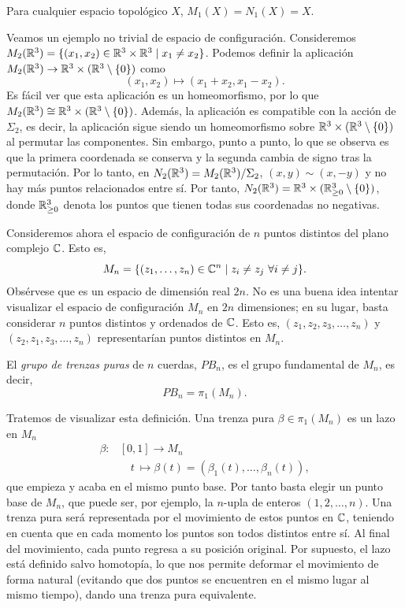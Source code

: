 \documentclass[TFG.tex]{subfiles}
\begin{document}
\begin{observacion}
Para cualquier espacio topológico $X$, $M_1(X)=N_1(X)=X$.
\end{observacion}

\begin{ej}
Veamos un ejemplo no trivial de espacio de configuración. Consideremos $M_2(\mathbb{R}^3)=\{(x_1,x_2)\in\mathbb{R}^3\times\mathbb{R}^3\mid x_1\neq x_2\}$. Podemos definir la aplicación $M_2(\mathbb{R}^3)\to \mathbb{R}^3\times(\mathbb{R}^3\setminus\{0\})$ como
\[
(x_1,x_2)\mapsto (x_1+x_2,x_1-x_2).
\]
Es fácil ver que esta aplicación es un homeomorfismo, por lo que $M_2(\mathbb{R}^3)\cong \mathbb{R}^3\times(\mathbb{R}^3\setminus\{0\})$. Además, la aplicación es compatible con la acción de $\Sigma_2$, es decir, la aplicación sigue siendo un homeomorfismo sobre $\mathbb{R}^3\times(\mathbb{R}^3\setminus\{0\})$ al permutar las componentes. Sin embargo, punto a punto, lo que se observa es que la primera coordenada se conserva y la segunda cambia de signo tras la permutación. Por lo tanto, en $N_2(\mathbb{R}^3)=M_2(\mathbb{R}^3)/\Sigma_2$, $(x,y)\sim (x,-y)$ y no hay más puntos relacionados entre sí. Por tanto, $N_2(\mathbb{R}^3)=\mathbb{R}^3\times(\mathbb{R}^3_{\geq 0}\setminus\{0\})$, donde $\mathbb{R}^3_{\geq 0}$ denota los puntos que tienen todas sus coordenadas no negativas.

\end{ej}


Consideremos ahora el espacio de configuración de $n$ puntos distintos del plano complejo $\mathbb{C}$. Esto es,
$$M_n=\{(z_1,\dots,z_n)\in\C^n\mid z_i\neq z_j\ \forall i\neq j\}.$$ 
Obsérvese que es un espacio de dimensión real $2n$. No es una buena idea intentar visualizar el espacio de configuración $M_n$ en $2n$ dimensiones; en su lugar, basta considerar $n$ puntos distintos y ordenados de $\mathbb{C}$. Esto es, $(z_1,z_2,z_3,\dots, z_n)$ y $(z_2,z_1,z_3,\dots, z_n)$ representarían puntos distintos en $M_n$. 
\begin{defi}
El \emph{grupo de trenzas puras} de $n$ cuerdas, $PB_n$, es el grupo fundamental de $M_n$, es decir,
$$PB_n=\pi_1(M_n).$$
\end{defi}

Tratemos de visualizar esta definición. Una trenza pura $\beta\in\pi_1(M_n)$ es un lazo en $M_n$
\begin{align*}
\beta: & [0,1]\to M_n\\
& \quad t\ \mapsto \beta(t)= (\beta_1(t),\dots, \beta_n(t)),
\end{align*}
que empieza y acaba en el mismo punto base. Por tanto basta elegir un punto base de $M_n$, que puede ser, por ejemplo, la $n$-upla de enteros $(1,2,\dots, n)$. Una trenza pura será representada por el movimiento de estos puntos en $\mathbb{C}$, teniendo en cuenta que en cada momento los puntos son todos distintos entre sí. Al final del movimiento, cada punto regresa a su posición original. Por supuesto, el lazo está definido salvo homotopía, lo que nos permite deformar el movimiento de forma natural (evitando que dos puntos se encuentren en el mismo lugar al mismo tiempo), dando una trenza pura equivalente.
\end{document}

